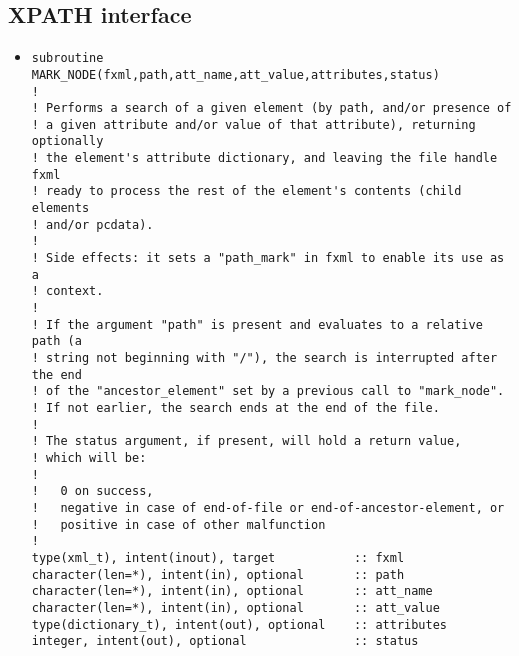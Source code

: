 \documentclass[11pt]{article}
\begin{document}
\subsection{XPATH interface}
%
\begin{itemize}
\item
\begin{verbatim}
subroutine MARK_NODE(fxml,path,att_name,att_value,attributes,status)
!
! Performs a search of a given element (by path, and/or presence of
! a given attribute and/or value of that attribute), returning optionally
! the element's attribute dictionary, and leaving the file handle fxml
! ready to process the rest of the element's contents (child elements
! and/or pcdata).
!
! Side effects: it sets a "path_mark" in fxml to enable its use as a 
! context.
!
! If the argument "path" is present and evaluates to a relative path (a
! string not beginning with "/"), the search is interrupted after the end
! of the "ancestor_element" set by a previous call to "mark_node".
! If not earlier, the search ends at the end of the file.
!
! The status argument, if present, will hold a return value,
! which will be:
!
!   0 on success,
!   negative in case of end-of-file or end-of-ancestor-element, or
!   positive in case of other malfunction
!
type(xml_t), intent(inout), target           :: fxml
character(len=*), intent(in), optional       :: path
character(len=*), intent(in), optional       :: att_name
character(len=*), intent(in), optional       :: att_value
type(dictionary_t), intent(out), optional    :: attributes
integer, intent(out), optional               :: status
\end{verbatim}


\end{itemize}
\end{document}
